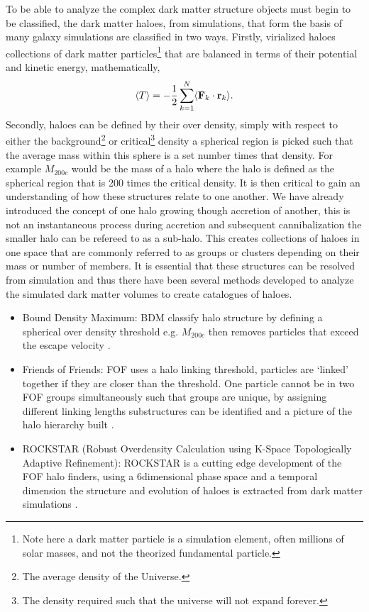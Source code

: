 To be able to analyze the complex dark matter structure objects must begin to be classified, the dark matter haloes, from simulations, that form the basis of many galaxy simulations are classified in two ways. Firstly, virialized haloes collections of dark matter particles\footnote{Note here a dark matter particle is a simulation element, often millions of solar masses, and not the theorized fundamental particle.} that are balanced in terms of their potential and kinetic energy, mathematically, 
\begin{equation}
    \langle T \rangle = -\frac{1}{2}\sum^{N}_{k=1}\langle \bold{F}_k \cdot \bold{r}_k \rangle.
\end{equation}
Secondly, haloes can be defined by their over density, simply with respect to either the background\footnote{The average density of the Universe.} or critical\footnote{The density required such that the universe will not expand forever.} density a spherical region is picked such that the average mass within this sphere is a set number times that density. For example $M_{200c}$ would be the mass of a halo where the halo is defined as the spherical region that is 200 times the critical density. It is then critical to gain an understanding of how these structures relate to one another. We have already introduced the concept of one halo growing though accretion of another, this is not an instantaneous process during accretion and subsequent cannibalization the smaller halo can be refereed to as a sub-halo. This creates collections of haloes in one space that are commonly referred to as groups or clusters depending on their mass or number of members. It is essential that these structures can be resolved from simulation and thus there have been several methods developed to analyze the simulated dark matter volumes to create catalogues of haloes. 

\begin{itemize}
    \item Bound Density Maximum: BDM classify halo structure by defining a spherical over density threshold e.g. $M_{200c}$ then removes particles that exceed the escape velocity \citep{Klypin1997Particle-MeshSimulations}.
    \item Friends of Friends: FOF uses a halo linking threshold, particles are `linked' together if they are closer than the threshold. One particle cannot be in two FOF groups simultaneously such that groups are unique, by assigning different linking lengths substructures can be identified and a picture of the halo hierarchy built \citep{Davis1985THEMATTER}.
    \item ROCKSTAR (Robust Overdensity Calculation using K-Space Topologically Adaptive Refinement): ROCKSTAR is a cutting edge development of the FOF halo finders, using a 6dimensional phase space and a temporal dimension the structure and evolution of haloes is extracted from dark matter simulations \citep{Behroozi2013TheCores}.
\end{itemize}

